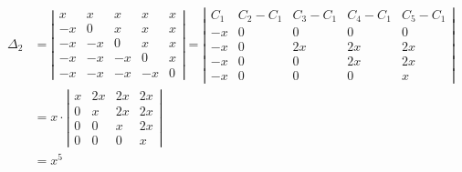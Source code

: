 {{$$\begin{aligned}
\end{aligned}
$$
$$
\begin{aligned}
	\Delta_2 & =\left|\begin{array}{ccccc}
		x & x & x & x & x \\
		-x & 0 & x & x & x \\
		-x & -x & 0 & x & x \\
		-x & -x & -x & 0 & x \\
		-x & -x & -x & -x & 0
	\end{array}\right|=\left|\begin{array}{ccccc}
		C_1 & C_2-C_1 & C_3-C_1 & C_4-C_1 & C_5-C_1 \\
		-x & 0 & 0 & 0 & 0 \\
		-x & 0 & 2 x & 2 x & 2 x \\
		-x & 0 & 0 & 2 x & 2 x \\
		-x & 0 & 0 & 0 & x
	\end{array}\right| \\
	& =x \cdot\left|\begin{array}{cccc}
		x & 2 x & 2 x & 2 x \\
		0 & x & 2 x & 2 x \\
		0 & 0 & x & 2 x \\
		0 & 0 & 0 & x
	\end{array}\right| \\
	& =x^5
\end{aligned}
$$
 }}
